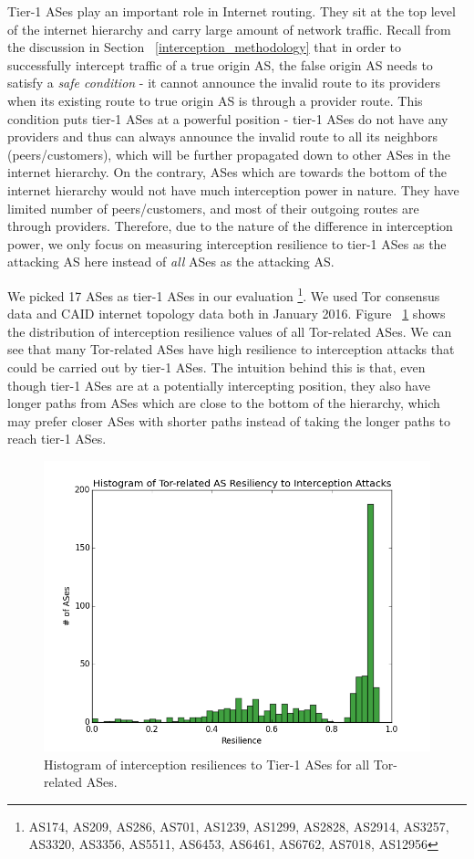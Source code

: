 Tier-1 ASes play an important role in Internet routing. They sit at the top level of the internet hierarchy and carry large amount of network traffic. Recall from the discussion in Section ~\ref{interception_methodology} that in order to successfully intercept traffic of a true origin AS, the false origin AS needs to satisfy a \emph{safe condition} - it cannot announce the invalid route to its providers when its existing route to true origin AS is through a provider route. This condition puts tier-1 ASes at a powerful position - tier-1 ASes do not have any providers and thus can always announce the invalid route to all its neighbors (peers/customers), which will be further propagated down to other ASes in the internet hierarchy. On the contrary, ASes which are towards the bottom of the internet hierarchy would not have much interception power in nature. They have limited number of peers/customers, and most of their outgoing routes are through providers. Therefore, due to the nature of the difference in interception power, we only focus on measuring interception resilience to tier-1 ASes as the attacking AS here instead of \emph{all} ASes as the attacking AS. 

We picked 17 ASes as tier-1 ASes in our evaluation \footnote{AS174, AS209, AS286, AS701, AS1239, AS1299, AS2828, AS2914, AS3257, AS3320, AS3356, AS5511, AS6453, AS6461, AS6762, AS7018, AS12956}. We used Tor consensus data and CAID internet topology data both in January 2016. Figure ~\ref{fig:interception_histogram} shows the distribution of interception resilience values of all Tor-related ASes. We can see that many Tor-related ASes have high resilience to interception attacks that could be carried out by tier-1 ASes. The intuition behind this is that, even though tier-1 ASes are at a potentially intercepting position, they also have longer paths from ASes which are close to the bottom of the hierarchy, which may prefer closer ASes with shorter paths instead of taking the longer paths to reach tier-1 ASes. 

\begin{figure}[ht!]
\centering
\includegraphics[width=.4\textwidth]{interception_resiliency}
\caption{Histogram of interception resiliences to Tier-1 ASes for all Tor-related ASes.}
\label{fig:interception_histogram}
\end{figure}

